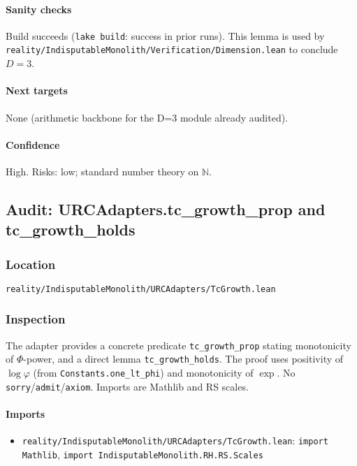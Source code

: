 \documentclass{article}
\newcommand{\FileRef}[1]{\texttt{#1}}
\begin{document}
\paragraph{Sanity checks}
Build succeeds (\texttt{lake build}: success in prior runs). This lemma is used by \FileRef{reality/IndisputableMonolith/Verification/Dimension.lean} to conclude \(D=3\).

\paragraph{Next targets} None (arithmetic backbone for the D=3 module already audited).

\paragraph{Confidence} High. Risks: low; standard number theory on \(\mathbb{N}\).

\subsection{Audit: URCAdapters.tc\_growth\_prop and tc\_growth\_holds}
\subsubsection{Location}
\FileRef{reality/IndisputableMonolith/URCAdapters/TcGrowth.lean}

\subsubsection{Inspection}
The adapter provides a concrete predicate \texttt{tc\_growth\_prop} stating monotonicity of \(\Phi\)-power, and a direct lemma \texttt{tc\_growth\_holds}. The proof uses positivity of \(\log \varphi\) (from \texttt{Constants.one\_lt\_phi}) and monotonicity of \(\exp\). No \texttt{sorry}/\texttt{admit}/\texttt{axiom}. Imports are Mathlib and RS scales.

\paragraph{Imports}
\begin{itemize}[leftmargin=*]
  \item \FileRef{reality/IndisputableMonolith/URCAdapters/TcGrowth.lean}: \texttt{import Mathlib}, \texttt{import IndisputableMonolith.RH.RS.Scales}
\end{itemize}
\end{document}
